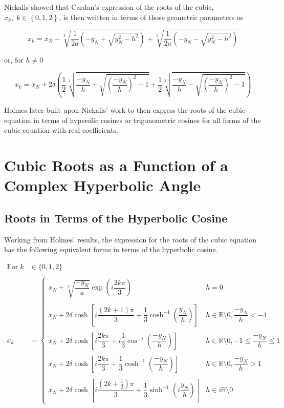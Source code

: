 \documentclass{article}
\begin{document}
\noindent
Nickalls showed that Cardan's expression of the roots of the cubic, \mbox{$x_k, \; k \in \left\{0,1,2\right\}$}, is then written in terms of those geometric parameters as

\begin{equation*}
	x_k = x_N + \sqrt[3]{\dfrac{1}{2a}\left(-y_N + \sqrt{y_N^2 - h^2}\right)} + \sqrt[3]{\dfrac{1}{2a}\left(-y_N - \sqrt{y_N^2 - h^2}\right)}
\end{equation*}

\noindent
or, for \mbox{$h \ne 0$}

\begin{equation*}
	x_k = x_N + 2\delta\left(\dfrac{1}{2}\sqrt[3]{\dfrac{-y_N}{h} + \sqrt{\left(\dfrac{-y_N}{h}\right)^2 -1}} + \dfrac{1}{2}\sqrt[3]{\dfrac{-y_N}{h} - \sqrt{\left(\dfrac{-y_N}{h}\right)^2 -1}}\right)
\end{equation*}

Holmes\cite{Holmes2002} later built upon Nickalls' work to then express the roots of the cubic equation in terms of hyperolic cosines or trigonometric cosines for all forms of the cubic equation with real coefficients.

\newpage
\section{Cubic Roots as a Function of a Complex Hyperbolic Angle}
\subsection{Roots in Terms of the Hyperbolic Cosine}
Working from Holmes' results, the expression for the roots of the cubic equation has the following equivalent forms in terms of the hyperbolic cosine.

\begin{align*}
	\mathrm{For} \; k &\in \{0, 1, 2\} \\
	\\
	x_k &= \begin{cases}
	x_N + \sqrt[3]{\dfrac{-y_N}{a}}\exp\left(i\dfrac{2k\pi}{3}\right) & h = 0\\
	\\
	x_N + 2\delta\cosh\left[i\dfrac{(2k+1)\pi}{3} + \dfrac{1}{3}\cosh^{-1}\left(\dfrac{y_N}{h}\right)\right] & h \in \mathbb{R}\setminus 0, \dfrac{-y_N}{h} < -1\\
	\\
	x_N + 2\delta\cosh\left[i\dfrac{2k\pi}{3} + i\dfrac{1}{3}\cos^{-1}\left(\dfrac{-y_N}{h} \right)\right] & h \in \mathbb{R}\setminus 0, -1 \le \dfrac{-y_N}{h} \le 1\\
	\\
	x_N + 2\delta\cosh\left[i\dfrac{2k\pi}{3} + \dfrac{1}{3}\cosh^{-1}\left(\dfrac{-y_N}{h}\right)\right] & h \in \mathbb{R}\setminus 0, \dfrac{-y_N}{h} > 1\\
	\\
	x_N + 2\delta\cosh\left[i\dfrac{\left(2k+\frac{1}{2}\right)\pi}{3} + \dfrac{1}{3}\sinh^{-1}\left(i\dfrac{y_N}{h}\right)\right] &  h \in i\mathbb{R}\setminus 0\end{cases}
\end{align*}
\end{document}
